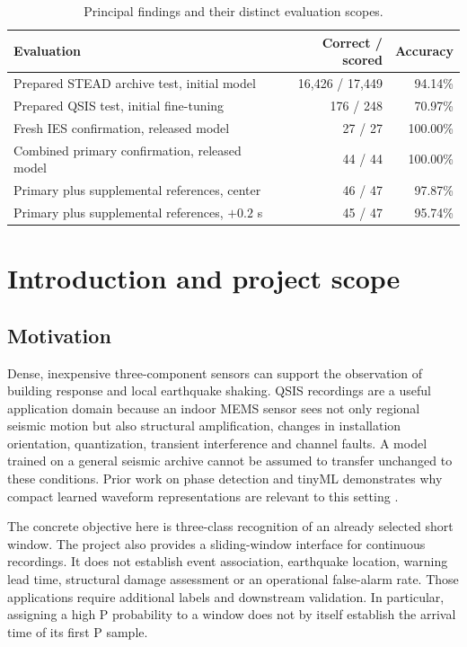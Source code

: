 \documentclass[a4paper,11pt,oneside]{article}
\begin{document}
\begin{table}[htbp]\centering\small
\caption{Principal findings and their distinct evaluation scopes.}
\begin{tabularx}{\linewidth}{Yrr}
\toprule Evaluation & Correct / scored & Accuracy \\\midrule
Prepared STEAD archive test, initial model & 16,426 / 17,449 & 94.14\% \\
Prepared QSIS test, initial fine-tuning & 176 / 248 & 70.97\% \\
Fresh IES confirmation, released model & 27 / 27 & 100.00\% \\
Combined primary confirmation, released model & 44 / 44 & 100.00\% \\
Primary plus supplemental references, center & 46 / 47 & 97.87\% \\
Primary plus supplemental references, $+0.2$ s & 45 / 47 & 95.74\% \\\bottomrule
\end{tabularx}
\end{table}
\clearpage
{\footnotesize\linespread{1.0}\selectfont\setlength{\parskip}{0pt}\tableofcontents}
\clearpage
{\small\setlength{\parskip}{0pt}\listoffigures}
\clearpage
{}

\section{Introduction and project scope}
\subsection{Motivation}
Dense, inexpensive three-component sensors can support the observation of
building response and local earthquake shaking. QSIS recordings are a useful
application domain because an indoor MEMS sensor sees not only regional
seismic motion but also structural amplification, changes in installation
orientation, quantization, transient interference and channel faults. A model
trained on a general seismic archive cannot be assumed to transfer unchanged
to these conditions. Prior work on phase detection and tinyML demonstrates
why compact learned waveform representations are relevant to this setting
\cite{10.1785/0120180080,10.1785/0220220322}.

The concrete objective here is three-class recognition of an already selected
short window. The project also provides a sliding-window interface for
continuous recordings. It does not establish event association, earthquake
location, warning lead time, structural damage assessment or an operational
false-alarm rate. Those applications require additional labels and downstream
validation. In particular, assigning a high P probability to a window does not
by itself establish the arrival time of its first P sample.
\end{document}
